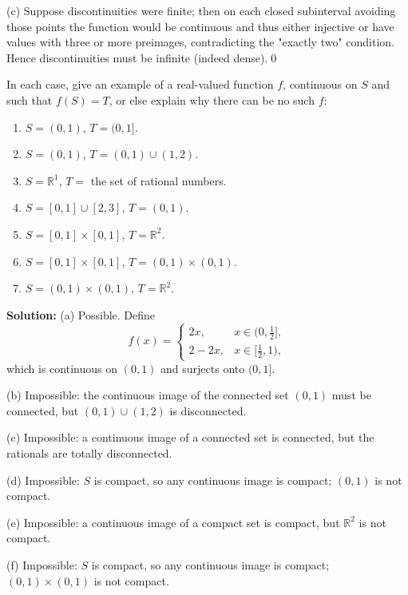 (c) Suppose discontinuities were finite; then on each closed subinterval avoiding those points the function would be continuous and thus either injective or have values with three or more preimages, contradicting the "exactly two" condition. Hence discontinuities must be infinite (indeed dense).\qed



\begin{problembox}
In each case, give an example of a real-valued function \( f \), continuous on \( S \) and such that \( f(S) = T \), or else explain why there can be no such \( f \):
\begin{enumerate}[label=(\alph*)]
\item \( S = (0, 1) \), \( T = (0, 1] \).
\item \( S = (0, 1) \), \( T = (0, 1) \cup (1, 2) \).
\item \( S = \mathbb{R}^1 \), \( T = \) the set of rational numbers.
\item \( S = [0, 1] \cup [2, 3] \), \( T = (0, 1) \).
\item \( S = [0, 1] \times [0, 1] \), \( T = \mathbb{R}^2 \).
\item \( S = [0, 1] \times [0, 1] \), \( T = (0, 1) \times (0, 1) \).
\item \( S = (0, 1) \times (0, 1) \), \( T = \mathbb{R}^2 \).
\end{enumerate}
\end{problembox}


\bigskip\noindent\textbf{Solution:}
(a) Possible. Define
\[
f(x)=\begin{cases}
2x,& x\in(0,\tfrac12],\\
2-2x,& x\in[\tfrac12,1),
\end{cases}
\]
which is continuous on $(0,1)$ and surjects onto $(0,1]$.

(b) Impossible: the continuous image of the connected set $(0,1)$ must be connected, but $(0,1)\cup(1,2)$ is disconnected.

(c) Impossible: a continuous image of a connected set is connected, but the rationals are totally disconnected.

(d) Impossible: $S$ is compact, so any continuous image is compact; $(0,1)$ is not compact.

(e) Impossible: a continuous image of a compact set is compact, but $\mathbb{R}^2$ is not compact.

(f) Impossible: $S$ is compact, so any continuous image is compact; $(0,1)\times(0,1)$ is not compact.

